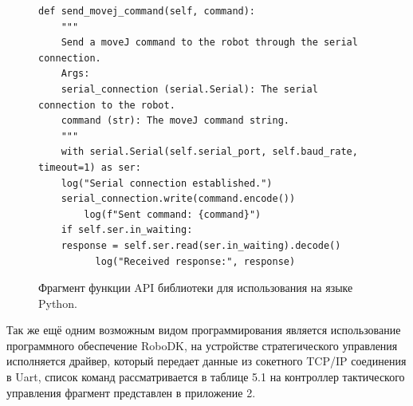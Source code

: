 \begin{figure}[H]
	\centering

	\begin{verbatim}
def send_movej_command(self, command):
    """
    Send a moveJ command to the robot through the serial connection.
    Args:       
    serial_connection (serial.Serial): The serial connection to the robot.
    command (str): The moveJ command string.
    """
    with serial.Serial(self.serial_port, self.baud_rate, timeout=1) as ser:
  	log("Serial connection established.")
    serial_connection.write(command.encode())
    	log(f"Sent command: {command}")
    if self.ser.in_waiting:
	response = self.ser.read(ser.in_waiting).decode()
          log("Received response:", response)
	\end{verbatim}
	\caption{Фрагмент функции API библиотеки для использования на языке Python.}\label{CodePython2}
\end{figure}


Так же ещё одним возможным видом программирования является использование программного обеспечение RoboDK, на устройстве стратегического управления исполняется драйвер, который передает данные из сокетного TCP/IP соединения в Uart, список команд рассматривается в таблице 5.1 на контроллер тактического управления фрагмент представлен в приложение 2.

